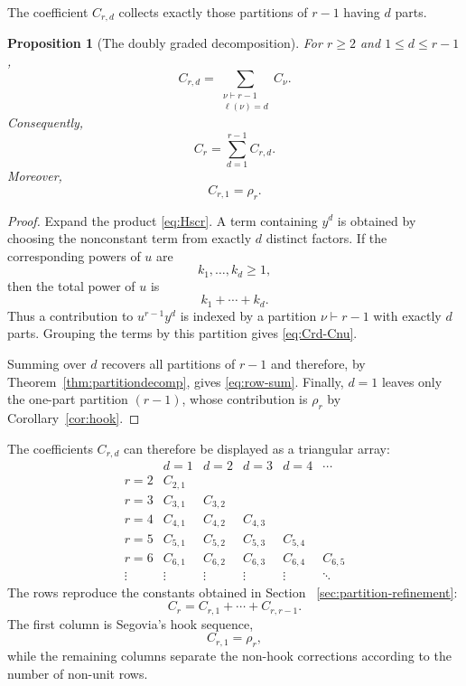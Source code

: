 \documentclass[11pt]{article}
\newtheorem{proposition}[theorem]{Proposition}
\theoremstyle{definition}
\begin{document}
The coefficient $C_{r,d}$ collects exactly those partitions of
$r-1$ having $d$ parts.

\begin{proposition}[The doubly graded decomposition]
\label{prop:triangle}
For $r\geq2$ and $1\leq d\leq r-1$,
\begin{equation}\label{eq:Crd-Cnu}
        C_{r,d}
        =
        \sum_{\substack{\nu\vdash r-1\\
                        \ell(\nu)=d}}
        C_\nu.
\end{equation}
Consequently,
\begin{equation}\label{eq:row-sum}
        C_r
        =
        \sum_{d=1}^{r-1}C_{r,d}.
\end{equation}
Moreover,
\begin{equation}\label{eq:first-column}
        C_{r,1}=\rho_r.
\end{equation}
\end{proposition}

\begin{proof}
Expand the product \eqref{eq:Hscr}.  A term containing $y^d$ is
obtained by choosing the nonconstant term from exactly $d$ distinct
factors.  If the corresponding powers of $u$ are
\[
        k_1,\ldots,k_d\geq1,
\]
then the total power of $u$ is
\[
        k_1+\cdots+k_d.
\]
Thus a contribution to $u^{r-1}y^d$ is indexed by a partition
$\nu\vdash r-1$ with exactly $d$ parts.  Grouping the terms by this
partition gives \eqref{eq:Crd-Cnu}.

Summing over $d$ recovers all partitions of $r-1$ and therefore,
by Theorem~\ref{thm:partitiondecomp}, gives
\eqref{eq:row-sum}.  Finally, $d=1$ leaves only the one-part
partition $(r-1)$, whose contribution is $\rho_r$ by
Corollary~\ref{cor:hook}.
\end{proof}

The coefficients $C_{r,d}$ can therefore be displayed as a triangular
array:
\[
\begin{array}{c|ccccc}
 & d=1 & d=2 & d=3 & d=4 & \cdots \\ \hline
 r=2 & C_{2,1} \\
 r=3 & C_{3,1} & C_{3,2} \\
 r=4 & C_{4,1} & C_{4,2} & C_{4,3} \\
 r=5 & C_{5,1} & C_{5,2} & C_{5,3} & C_{5,4}\\
 r=6 & C_{6,1} & C_{6,2} & C_{6,3} & C_{6,4}
       & C_{6,5}\\
 \vdots & \vdots & \vdots & \vdots & \vdots & \ddots
\end{array}
\]
The rows reproduce the constants obtained in Section~
\ref{sec:partition-refinement}:
\[
        C_r=C_{r,1}+\cdots+C_{r,r-1}.
\]
The first column is Segovia's hook sequence,
\[
        C_{r,1}=\rho_r,
\]
while the remaining columns separate the non-hook corrections
according to the number of non-unit rows.
\end{document}
